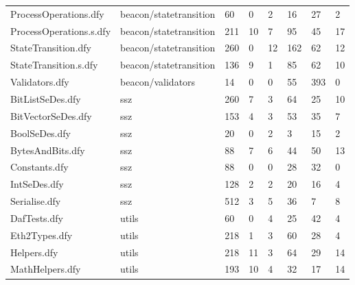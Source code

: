 \documentclass[a4paper, 12pt]{article}
\begin{document}
\begin{tabular}{llllllll}
   ProcessOperations.dfy &  beacon/statetransition &    60 &        0 &               2 &            16 &            27 &      2 \\
 ProcessOperations.s.dfy &  beacon/statetransition &   211 &       10 &               7 &            95 &            45 &     17 \\
     StateTransition.dfy &  beacon/statetransition &   260 &        0 &              12 &           162 &            62 &     12 \\
   StateTransition.s.dfy &  beacon/statetransition &   136 &        9 &               1 &            85 &            62 &     10 \\
          Validators.dfy &       beacon/validators &    14 &        0 &               0 &            55 &           393 &      0 \\
        BitListSeDes.dfy &                     ssz &   260 &        7 &               3 &            64 &            25 &     10 \\
      BitVectorSeDes.dfy &                     ssz &   153 &        4 &               3 &            53 &            35 &      7 \\
           BoolSeDes.dfy &                     ssz &    20 &        0 &               2 &             3 &            15 &      2 \\
        BytesAndBits.dfy &                     ssz &    88 &        7 &               6 &            44 &            50 &     13 \\
           Constants.dfy &                     ssz &    88 &        0 &               0 &            28 &            32 &      0 \\
            IntSeDes.dfy &                     ssz &   128 &        2 &               2 &            20 &            16 &      4 \\
           Serialise.dfy &                     ssz &   512 &        3 &               5 &            36 &             7 &      8 \\
            DafTests.dfy &                   utils &    60 &        0 &               4 &            25 &            42 &      4 \\
           Eth2Types.dfy &                   utils &   218 &        1 &               3 &            60 &            28 &      4 \\
             Helpers.dfy &                   utils &   218 &       11 &               3 &            64 &            29 &     14 \\
         MathHelpers.dfy &                   utils &   193 &       10 &               4 &            32 &            17 &     14 \\

\end{tabular}
\end{document}

